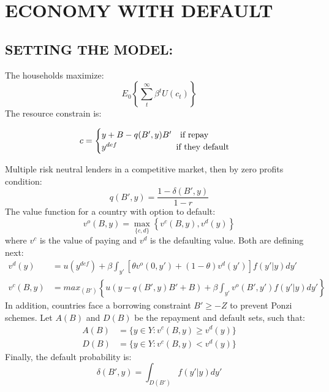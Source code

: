 \documentclass[11pt, a4paper]{article}
\theoremstyle{definition}
\begin{document}
\section{ECONOMY WITH DEFAULT}
	\subsection{SETTING THE MODEL:}
	The households maximize:
	\begin{equation}	
		E_0\left\{ \sum_t^{\infty} \beta^t U(c_t)\right\}
	\end{equation}
	The resource constrain is:
	\begin{center}
	\begin{equation*}
	 c = 
	 \begin{cases}
	 y + B - q(B',y)B' \quad \text{if repay}\\
	 y^{def}	 \text{\hspace{2.3cm} if they default}
	 \end{cases}
	\end{equation*}
	\end{center}
	Multiple risk neutral lenders in a competitive market, then by zero profits condition:
	\begin{equation}
		q(B',y) = \frac{1-\delta(B',y)}{1-r}
	\end{equation}
	The value function for a country with option to default:
	\begin{equation}
		v^o(B,y) = \max_{\{c,d\}}\left\{ v^c(B,y),v^d(y)\right\}
	\end{equation}
	where $v^c$ is the value of paying and $v^d$ is the defaulting value. Both are defining next:
	\begin{align}
	v^d(y) &= u(y^{def}) + \beta\int_{y'} \left[ \theta v^o(0,y') + (1-\theta)v^d(y')\right]f(y'|y)dy'\\
	v^c(B,y) &= max_{(B')}\left\{ u(y - q(B',y)B'+B) + \beta\int_{y'}v^o(B',y')f(y'|y)dy' \right\} 
	\end{align}
	In addition, countries face a borrowing constraint $B'\geq -Z$ to prevent Ponzi schemes. Let $A(B)$ and $D(B)$ be the repayment and default sets, such that:
	\begin{align}
	 A(B)&=\{y \in Y: v^c(B,y)\geq v^d(y)\}\\
	 D(B)&=\{y \in  Y: v^c(B,y)< v^d(y)\} 
	\end{align}
	Finally, the default probability is:
	\begin{equation}
		\delta(B',y) = \int_{D(B')}f(y'|y)dy'
	\end{equation}
\end{document}
